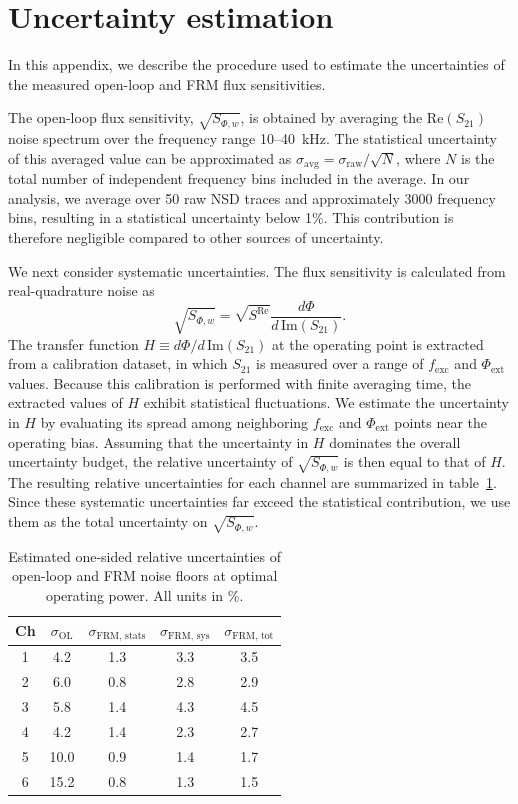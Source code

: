 \documentclass[
 prd,
 reprint,
 superscriptaddress,
 amsmath,amssymb,
 aps,
 floatfix,
]{revtex4-2}
\begin{document}
\section{Uncertainty estimation} \label{appx:uncertainties}
In this appendix, we describe the procedure used to estimate the uncertainties of the measured open-loop and FRM flux sensitivities.

The open-loop flux sensitivity, $\sqrt{S_{\Phi,w}}$, is obtained by averaging the $\mathrm{Re}(S_{21})$ noise spectrum over the frequency range 10--\qty{40}{\kHz}. The statistical uncertainty of this averaged value can be approximated as \mbox{$\sigma_{\mathrm{avg}} = \sigma_{\mathrm{raw}}/\sqrt{N}$}, where $N$ is the total number of independent frequency bins included in the average. In our analysis, we average over 50 raw NSD traces and approximately 3000 frequency bins, resulting in a statistical uncertainty below 1\%. This contribution is therefore negligible compared to other sources of uncertainty.

We next consider systematic uncertainties. The flux sensitivity is calculated from real-quadrature noise as
\begin{equation}
    \sqrt{S_{\Phi,w}} = \sqrt{S^{\text{Re}}} \frac{d\Phi}{d\,\mathrm{Im}(S_{21})}.
\end{equation}
The transfer function $H \equiv d\Phi/d\,\mathrm{Im}(S_{21})$ at the operating point is extracted from a calibration dataset, in which $S_{21}$ is measured over a range of $f_{\mathrm{exc}}$ and $\Phi_{\mathrm{ext}}$ values. Because this calibration is performed with finite averaging time, the extracted values of $H$ exhibit statistical fluctuations. We estimate the uncertainty in $H$ by evaluating its spread among neighboring $f_{\mathrm{exc}}$ and $\Phi_{\mathrm{ext}}$ points near the operating bias. Assuming that the uncertainty in $H$ dominates the overall uncertainty budget, the relative uncertainty of $\sqrt{S_{\Phi,w}}$ is then equal to that of $H$. The resulting relative uncertainties for each channel are summarized in table~\ref{tab:uncertainties}. Since these systematic uncertainties far exceed the statistical contribution, we use them as the total uncertainty on $\sqrt{S_{\Phi,w}}$.

\begin{table}[htb]
    \centering
    \begin{tabular}{c c c c c}
    \hline
         Ch & $\sigma_{\text{OL}}$ & $\sigma_{\text{FRM, stats}}$ & $\sigma_{\text{FRM, sys}}$ & $\sigma_{\text{FRM, tot}}$\\
    \hline
    1 & 4.2 & 1.3 & 3.3 & 3.5\\
    2 & 6.0 & 0.8 & 2.8 & 2.9\\
    3 & 5.8 & 1.4 & 4.3 & 4.5\\
    4 & 4.2 & 1.4 & 2.3 & 2.7\\
    5 & 10.0 & 0.9 & 1.4 & 1.7\\
    6 & 15.2 & 0.8 & 1.3 & 1.5\\
    \hline
    \end{tabular}
    \caption{Estimated one-sided relative uncertainties of open-loop and FRM noise floors at optimal operating power. All units in \%.}
    \label{tab:uncertainties}
\end{table}
\end{document}
